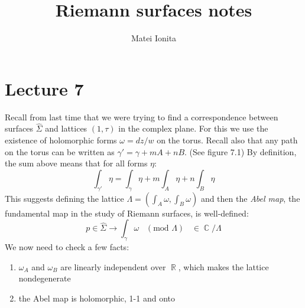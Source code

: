 \documentclass[12 pt]{article}
\title{Riemann surfaces notes}
\author{Matei Ionita}
\DeclareMathOperator {\R} {\mathbb{R}}
\DeclareMathOperator {\C} {\mathbb{C}}
\theoremstyle{plain}
\theoremstyle{definition}
\theoremstyle{remark}
\begin{document}
  \maketitle

\section*{Lecture 7}
Recall from last time that we were trying to find a correspondence between surfaces $\hat \Sigma$ and lattices $(1, \tau)$ in the complex plane. For this we use the existence of holomorphic forms $\omega = dz/w$ on the torus. Recall also that any path on the torus can be written as $\gamma' = \gamma + m A + n B$. (See figure 7.1) By definition, the sum above means that for all forms $\eta$:
\[         \int_{\gamma'} \eta = \int_{\gamma} \eta + m \int_A \eta + n \int_B \eta    \]
This suggests defining the lattice $\Lambda = (\int_A \omega, \int_B \omega)$ and then the \emph{Abel map}, the fundamental map in the study of Riemann surfaces, is well-defined:
\[       p \in \hat \Sigma  \to \int_{\gamma} \omega \;\;\; (\text{mod } \Lambda) \;\;\; \in \C/\Lambda  \]
We now need to check a few facts:
\begin{enumerate} [(1)]
\item $\omega_A$ and $\omega_B$ are linearly independent over $\R$, which makes the lattice nondegenerate
\item the Abel map is holomorphic, 1-1 and onto
\end{enumerate}
\end{document}
